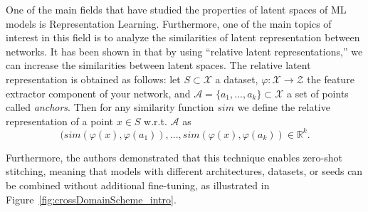 \documentclass[../main.tex]{subfiles}
\begin{document}
One of the main fields that have studied the properties of latent spaces of ML models is Representation Learning. Furthermore, one of the main topics of interest in this field is to analyze the similarities of latent representation between networks. It has been shown in \cite{moschella_relative_2022} that by using ``relative latent representations,'' we can increase the similarities between latent spaces. The relative latent representation is obtained as follows: let $S\subset\mathcal{X}$ a dataset, $\varphi: \mathcal{X} \to \mathcal{Z}$ the feature extractor component of your network, and $\mathcal{A}=\{a_1, ..., a_k\}\subset\mathcal{X}$ a set of points called \emph{anchors}. Then for any similarity function $sim$ we define the relative representation of a point $x\in S$  w.r.t. $\mathcal{A}$ as
\[
(sim(\varphi(x), \varphi(a_1)), ..., sim(\varphi(x), \varphi(a_k))\in \mathbb{R}^k.
\]

Furthermore, the authors demonstrated that this technique enables zero-shot stitching, meaning that models with different architectures, datasets, or seeds can be combined without additional fine-tuning, as illustrated in Figure~\ref{fig:crossDomainScheme_intro}.\\
\end{document}
